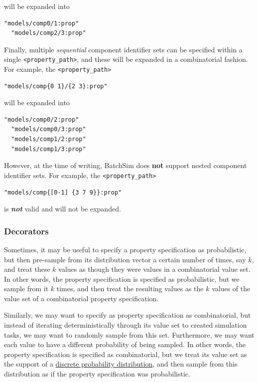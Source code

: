 \documentclass{article}
\begin{document}
will be expanded into

\begin{lstlisting}[]
  "models/comp0/1:prop"
  "models/comp2/3:prop"
\end{lstlisting}

Finally, multiple \textit{sequential} component identifier sets can be specified within a single {\tt <property\_path>}, and these will be expanded in a combinatorial fashion. For example, the {\tt <property\_path>}

\begin{lstlisting}[]
  "models/comp{0 1}/{2 3}:prop"
\end{lstlisting}

will be expanded into

\begin{lstlisting}[]
  "models/comp0/2:prop"
  "models/comp0/3:prop"
  "models/comp1/2:prop"
  "models/comp1/3:prop"
\end{lstlisting}

However, at the time of writing, BatchSim does \textbf{not} support nested component identifier sets. For example, the {\tt <property\_path>}

\begin{lstlisting}[]
  "models/comp{[0-1] {3 7 9}}:prop"
\end{lstlisting}

is \textbf{\textit{not}} valid and will not be expanded.

\subsubsection{Decorators}

Sometimes, it may be useful to specify a property specification as probabilistic, but then pre-sample from its distribution vector a certain number of times, say $k$, and treat these $k$ values as though they were values in a combinatorial value set. In other words, the property specification is specified as probabilistic, but we sample from it $k$ times, and then treat the resulting values as the $k$ values of the value set of a combinatorial property specification.

Similarly, we may want to specify as property specification as combinatorial, but instead of iterating deterministically through its value set to created simulation tasks, we may want to randomly sample from this set. Furthermore, we may want each value to have a different probability of being sampled. In other words, the property specification is specified as combinatorial, but we treat its value set as the support of a \href{https://en.wikipedia.org/wiki/Probability_distribution#Discrete_probability_distribution}{discrete probability distribution}, and then sample from this distribution as if the property specification was probabilistic.
\end{document}
